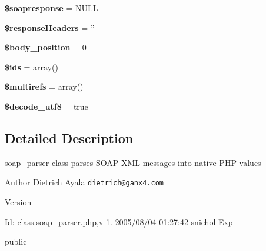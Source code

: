 \begin{DoxyCompactItemize}
\item 
\hypertarget{classsoap__parser_a9c288aee507cd28cde513ae4985be173}{{\bfseries \$soapresponse} = N\-U\-L\-L}\label{classsoap__parser_a9c288aee507cd28cde513ae4985be173}

\item 
\hypertarget{classsoap__parser_a02f80cf3a7fe7cf42c97b821c167b934}{{\bfseries \$response\-Headers} = ''}\label{classsoap__parser_a02f80cf3a7fe7cf42c97b821c167b934}

\item 
\hypertarget{classsoap__parser_a58122f77be3e3451ebf7c4aad1d1334b}{{\bfseries \$body\-\_\-position} = 0}\label{classsoap__parser_a58122f77be3e3451ebf7c4aad1d1334b}

\item 
\hypertarget{classsoap__parser_af24e92ed6a9d45a19989253526012e03}{{\bfseries \$ids} = array()}\label{classsoap__parser_af24e92ed6a9d45a19989253526012e03}

\item 
\hypertarget{classsoap__parser_a4cd04442a0b327bd7495c402c7621fdc}{{\bfseries \$multirefs} = array()}\label{classsoap__parser_a4cd04442a0b327bd7495c402c7621fdc}

\item 
\hypertarget{classsoap__parser_a15fe586a802bc22337e3fe874d6da038}{{\bfseries \$decode\-\_\-utf8} = true}\label{classsoap__parser_a15fe586a802bc22337e3fe874d6da038}

\end{DoxyCompactItemize}


\subsection{Detailed Description}
\hyperlink{classsoap__parser}{soap\-\_\-parser} class parses S\-O\-A\-P X\-M\-L messages into native P\-H\-P values

\begin{DoxyAuthor}{Author}
Dietrich Ayala \href{mailto:dietrich@ganx4.com}{\tt dietrich@ganx4.\-com} 
\end{DoxyAuthor}
\begin{DoxyVersion}{Version}

\end{DoxyVersion}
\begin{DoxyParagraph}{Id\-:}
\hyperlink{class_8soap__parser_8php_source}{class.\-soap\-\_\-parser.\-php},v 1. 2005/08/04 01\-:27\-:42 snichol Exp 
\end{DoxyParagraph}
public

